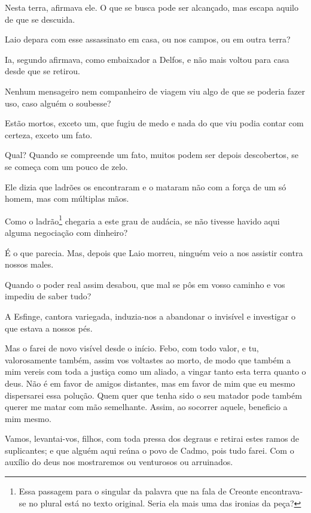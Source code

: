    Nesta terra, afirmava ele. O que se busca pode ser alcançado, mas
escapa aquilo de que se descuida.

   Laio depara com esse assassinato em casa, ou nos campos, ou em outra
terra?

   Ia, segundo afirmava, como embaixador a Delfos, e não mais voltou para
casa desde que se retirou.

   Nenhum mensageiro nem companheiro de viagem viu algo de que se poderia
fazer uso, caso alguém o soubesse?

   Estão mortos, exceto um, que fugiu de medo e nada do que viu podia
contar com certeza, exceto um fato.

  Qual? Quando  se compreende um fato, muitos podem ser depois
descobertos, se se começa com um pouco de zelo.

   Ele dizia que ladrões os encontraram e o mataram não com a força de um
só homem, mas com múltiplas mãos.

   Como o ladrão\footnote{Essa passagem para o singular da palavra que na
  fala de Creonte encontrava-se no plural está no texto original. Seria
  ela mais uma das ironias da peça?} chegaria a este grau de audácia, se
não tivesse havido aqui alguma negociação com dinheiro?

   É o que parecia. Mas, depois que Laio morreu, ninguém veio a nos
assistir contra nossos males.

   Quando o poder real assim desabou, que mal se pôs em vosso caminho e vos
impediu de saber tudo?

   A Esfinge, cantora variegada, induzia-nos a abandonar o invisível
e investigar o que estava a nossos pés.

   Mas o farei de novo visível desde o início. Febo, com todo valor, e tu,
valorosamente também, assim vos voltastes ao morto, de modo que também a
mim vereis com toda a justiça como um aliado, a vingar tanto esta terra
quanto o deus. Não é em favor de amigos distantes, mas em favor de mim
que eu mesmo dispersarei essa polução. Quem quer que tenha sido o
seu matador pode também querer me matar com mão semelhante. Assim, ao
socorrer aquele, beneficio a mim mesmo.

Vamos, levantai-vos, filhos, com toda pressa dos degraus e retirai estes
ramos de suplicantes; e que alguém aqui reúna o povo de Cadmo, pois tudo
farei. Com o auxílio do deus nos mostraremos ou venturosos ou
arruinados.

